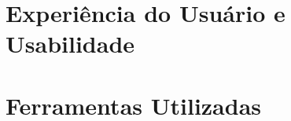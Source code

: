     \section{Experiência do Usuário e Usabilidade}
    \label{sec:ux_usabilidade}

    \section{Ferramentas Utilizadas}
    \label{sec:ferramentas_utilizadas}


